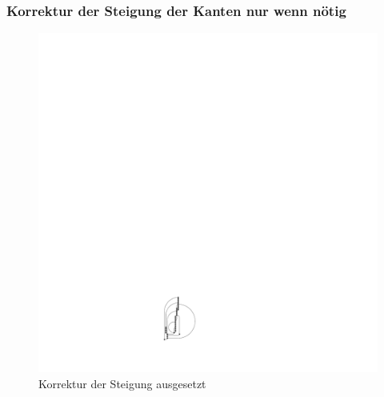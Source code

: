 \documentclass{beamer}
\begin{document}
\begin{frame}
  \frametitle{ Korrektur der Steigung der Kanten nur wenn nötig}
\begin{figure}[h]
  \centering
  \includegraphics{hugeGraph/isSmaller}
  \caption{ Korrektur der Steigung ausgesetzt}
  \label{fig:exampleAsmoothSimple}
\end{figure}
\end{frame}
\end{document}
